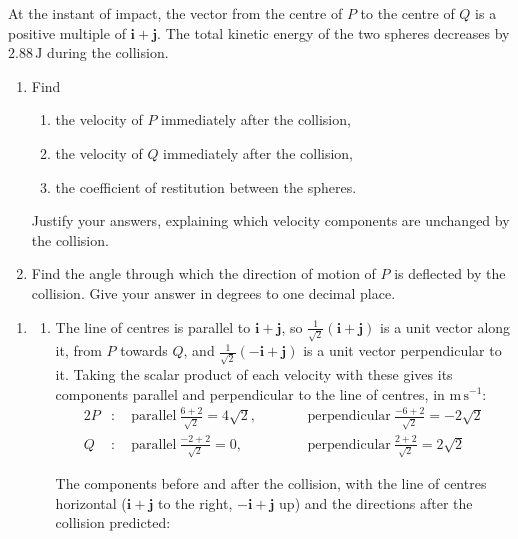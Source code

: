 \documentclass[leqno]{article}
\begin{document}
\begin{enumerate}[
  label=\textbf{\arabic*.},
  leftmargin=*,
  topsep=0pt,
  partopsep=0pt,
  parsep=0pt
]
At the instant of impact, the vector from the centre of $P$ to the centre of $Q$ is a positive multiple of $\mathbf{i}+\mathbf{j}$. The total kinetic energy of the two spheres decreases by $2.88\,\mathrm{J}$ during the collision. \\
\begin{enumerate}[label=\textbf{(\alph*)}]
\item Find
\begin{enumerate}[label=(\roman*)]
\item the velocity of $P$ immediately after the collision,
\item the velocity of $Q$ immediately after the collision,
\item the coefficient of restitution between the spheres.
\end{enumerate}
Justify your answers, explaining which velocity components are unchanged by the collision.  \\
\item Find the angle through which the direction of motion of $P$ is deflected by the collision. Give your answer in degrees to one decimal place.  \\
\end{enumerate}

\vspace*{10pt}

\begin{djsSolution}
\begin{enumerate}[label=\textbf{(\alph*)}, start=1]
\item
\begin{enumerate}[label=(\roman*), start=1]
\item The line of centres is parallel to \(\mathbf{i}+\mathbf{j}\), so \(\frac{1}{\sqrt2}(\mathbf{i}+\mathbf{j})\) is a unit vector along it, from \(P\) towards \(Q\), and \(\frac{1}{\sqrt2}(-\mathbf{i}+\mathbf{j})\) is a unit vector perpendicular to it. Taking the scalar product of each velocity with these gives its components parallel and perpendicular to the line of centres, in \(\mathrm{m\,s^{-1}}\):
\begin{alignat*}{2}
P&:\quad\text{parallel}\ \frac{6+2}{\sqrt2}=4\sqrt2,&\qquad&\text{perpendicular}\ \frac{-6+2}{\sqrt2}=-2\sqrt2\\
Q&:\quad\text{parallel}\ \frac{-2+2}{\sqrt2}=0,&&\text{perpendicular}\ \frac{2+2}{\sqrt2}=2\sqrt2
\end{alignat*}

The components before and after the collision, with the line of centres horizontal (\(\mathbf{i}+\mathbf{j}\) to the right, \(-\mathbf{i}+\mathbf{j}\) up) and the directions after the collision predicted:\par\nopagebreak


\end{enumerate}
\end{enumerate}
\end{djsSolution}
\end{enumerate}
\end{document}
